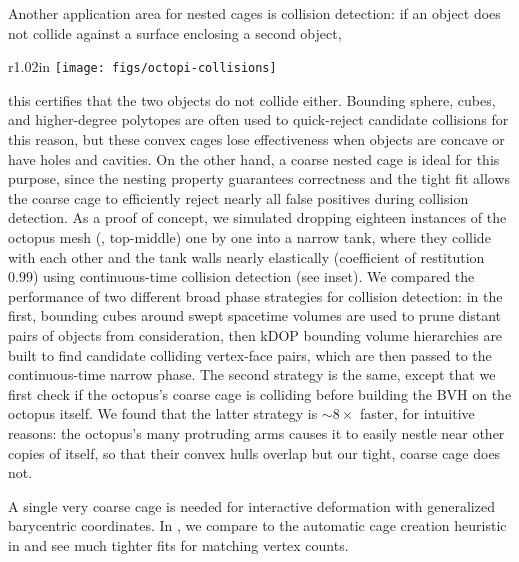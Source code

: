 Another application area for nested cages is collision detection: if an object
does not collide against a surface enclosing a second object, 
%
\begin{wrapfigure}{r}{1.02in}
%
\centering
%
\texttt{[image: figs/octopi-collisions]}
%
\end{wrapfigure}
%
this certifies that the two objects do not collide either.
%
%
Bounding sphere, cubes, and
higher-degree polytopes are often used to quick-reject candidate collisions for
this reason, but these convex cages lose effectiveness when objects are concave
or have holes and cavities. On the other hand, a coarse nested cage is ideal
for this purpose, since the nesting property guarantees correctness and the
tight fit allows the coarse cage to efficiently reject nearly all false
positives during collision detection. As a proof of concept, we simulated
dropping eighteen instances of the octopus mesh (,
top-middle) one by one into a narrow tank, where they collide with each other
and the tank walls nearly elastically (coefficient of restitution $0.99$) using
continuous-time collision detection (see inset). We compared the performance of
two different broad phase strategies for collision detection: in the first,
bounding cubes around swept spacetime volumes are used to prune distant pairs
of objects from consideration, then kDOP bounding volume hierarchies are built
to find candidate colliding vertex-face pairs, which are then passed to the
continuous-time narrow phase. The second strategy is the same, except
that we first check if the octopus's coarse cage is colliding before building
the BVH on the octopus itself. We found that the latter strategy is 
$\sim 8\times$ faster, for intuitive reasons: the octopus's many
protruding arms causes it to easily nestle near other copies of itself, so that
their convex hulls overlap but our tight, coarse cage does not.
%

A single very coarse cage is needed for interactive deformation with
generalized barycentric coordinates.
%
In , we compare to the automatic cage creation
heuristic in \cite{Ben-Chen:2009:SDT} and see much tighter fits for matching
vertex counts.

